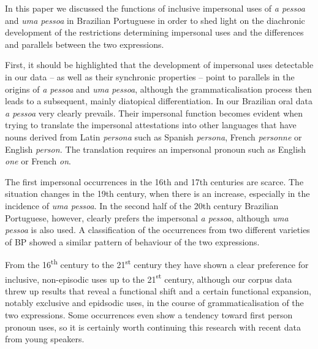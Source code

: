 \documentclass[output=paper]{langscibook}
\begin{document}
In this paper we discussed the functions of inclusive impersonal uses of \textit{a pessoa} and \textit{uma pessoa} in Brazilian Portuguese in order to shed light on the diachronic development of the restrictions determining impersonal uses and the differences and parallels between the two expressions.


First, it should be highlighted that the development of impersonal uses detectable in our data – as well as their synchronic properties – point to parallels in the origins of \textit{a pessoa} {and} \textit{uma pessoa}, although the grammaticalisation process then leads to a subsequent, mainly diatopical differentiation. In our Brazilian oral data \textit{a pessoa} very clearly prevails. Their impersonal function becomes evident when trying to translate the impersonal attestations into other languages that have nouns derived from Latin \textit{persona} such as Spanish \textit{persona}, French  \textit{personne} {or English} {\textit{person.}} {The translation requires an impersonal pronoun such as English} {\textit{one}} {or French} {\textit{on}}. 



{The first impersonal occurrences in the 16th and 17th centuries are scarce. The situation changes in the 19th century, when there is an increase, especially in the incidence of} {\textit{uma pessoa}}{. In the second half of the 20th century Brazilian Portuguese, however, clearly prefers the impersonal} {\textit{a pessoa}}{, although} {\textit{uma pessoa}} is also used. A classification of the occurrences from two different varieties of BP showed a similar pattern of behaviour of the two expressions.



{From  the 16}{\textsuperscript{th}} {century to the 21}{\textsuperscript{st}} {century they have shown a clear preference for inclusive, non-episodic uses up to the 21}{\textsuperscript{st}} {century, although our corpus data threw up results that reveal a functional shift and a certain functional expansion, notably exclusive and epidsodic uses, in the course of grammaticalisation of the two expressions. Some occurrences even show a tendency toward first person pronoun uses, so it is certainly worth continuing this research with recent data from young speakers.}


\label{appendix:amaral}
\end{document}
